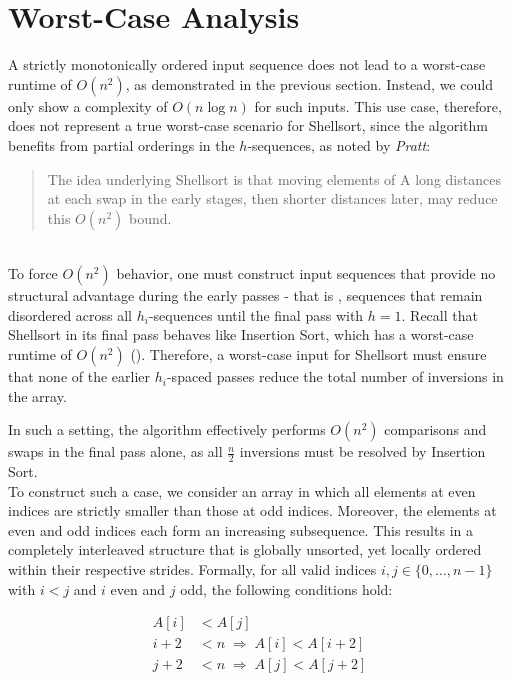 \section{Worst-Case Analysis}


A strictly monotonically ordered input sequence does not lead to a worst-case runtime of $O(n^2)$, as demonstrated in the previous section.
Instead, we could only show a complexity of $O(n \log n)$ for such inputs.
This use case, therefore, does not represent a true worst-case scenario for Shellsort, since the algorithm benefits from partial orderings in the $h$-sequences, as noted by \textit{Pratt}:

\blockquote[{\cite[3]{Pra72}}]{The idea underlying Shellsort is that moving elements of A long
    distances at each swap in the early stages, then shorter distances
    later, may reduce this $O(n^2)$ bound.
}\\

\noindent
To force $O(n^2)$ behavior, one must construct input sequences that provide no structural advantage during the early passes - that is , sequences that remain disordered across all $h_i$-sequences until the final pass with $h = 1$.
Recall that Shellsort in its final pass behaves like Insertion Sort, which has a worst-case runtime of $O(n^2)$ (\cite[87]{OW17b}).
Therefore, a worst-case input for Shellsort must ensure that none of the earlier $h_i$-spaced passes reduce the total number of inversions in the array.

In such a setting, the algorithm effectively performs $O(n^2)$ comparisons and swaps in the final pass alone, as all $\frac{n}{2}$ inversions must be resolved by Insertion Sort.\\

To construct such a case, we consider an array in which all elements at even indices are strictly smaller than those at odd indices.
Moreover, the elements at even and odd indices each form an increasing subsequence.
This results in a completely interleaved structure that is globally unsorted, yet locally ordered within their respective strides.
Formally, for all valid indices $i, j \in \{0, \dots, n - 1\}$ with $i < j$ and $i$ even and $j$ odd, the following conditions hold:

\[
    \begin{aligned}
        A[i] &< A[j] \\
        i + 2 &< n \;\Rightarrow\; A[i] < A[i + 2] \\
        j + 2 &< n \;\Rightarrow\; A[j] < A[j + 2]
    \end{aligned}
\]

